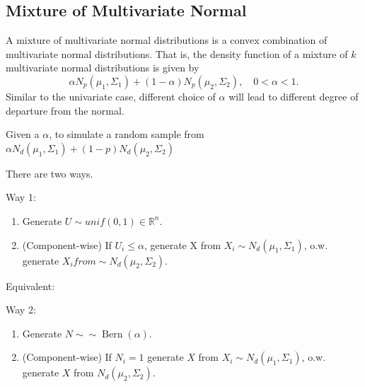 \documentclass[
  letterpaper,
  DIV=11,
  numbers=noendperiod]{scrreprt}
\begin{document}
\subsection{Mixture of Multivariate
Normal}\label{mixture-of-multivariate-normal}

A mixture of multivariate normal distributions is a convex combination
of multivariate normal distributions. That is, the density function of a
mixture of \(k\) multivariate normal distributions is given by \[
\alpha N_p(\mu_1,\Sigma_1) + (1-\alpha) N_p(\mu_2,\Sigma_2), \quad 0 < \alpha < 1.
\] Similar to the univariate case, different choice of \(\alpha\) will
lead to different degree of departure from the normal.

Given a \(\alpha\), to simulate a random sample from
\(\alpha N_d(\mu_1, \Sigma_1) + (1 − p) N_d(\mu_2, \Sigma_2)\)

There are two ways.

Way 1:

\begin{enumerate}
\def\labelenumi{\arabic{enumi}.}
\item
  Generate \(U \sim unif(0,1) \in \mathbb{R}^n\).
\item
  (Component-wise) If \(U_i \le \alpha\), generate X from
  \(X_i\sim N_d(\mu_1, \Sigma_1)\), o.w. generate
  \(X_i from \sim N_d(\mu_2, \Sigma_2)\).
\end{enumerate}

Equivalent:

Way 2:

\begin{enumerate}
\def\labelenumi{\arabic{enumi}.}
\item
  Generate \(N \sim ∼ \operatorname{Bern}(\alpha)\).
\item
  (Component-wise) If \(N_i = 1\) generate \(X\) from
  \(X_i \sim N_d(\mu_1, \Sigma_1)\), o.w. generate \(X\) from
  \(N_d(\mu_2, \Sigma_2)\).
\end{enumerate}
\end{document}
